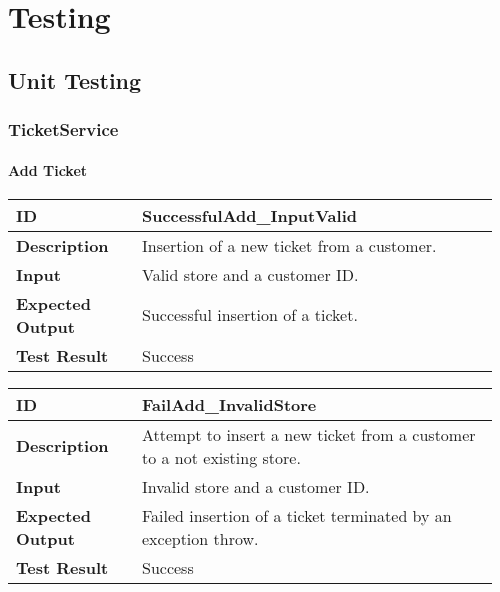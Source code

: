 \chapter{Testing}
\section{Unit Testing}
\subsection{TicketService}
\subsubsection{Add Ticket}
\begin{table}[H]
	\centering
	\begin{tabular}{@{}p{0.25\linewidth}p{0.71\linewidth}@{}}
		\toprule
		\textbf{ID} & SuccessfulAdd\_InputValid \\
		\midrule
		\textbf{Description} & Insertion of a new ticket from a customer. \\
		\midrule
		\textbf{Input} & Valid store and a customer ID.\\
		\midrule
		\textbf{Expected Output} & Successful insertion of a ticket.\\
		\midrule
		\textbf{Test Result} & Success\\
		\bottomrule
	\end{tabular}
\end{table}

\begin{table}[H]
	\centering
	\begin{tabular}{@{}p{0.25\linewidth}p{0.71\linewidth}@{}}
		\toprule
		\textbf{ID} & FailAdd\_InvalidStore \\
		\midrule
		\textbf{Description} & Attempt to insert a new ticket from a customer to a not existing store. \\
		\midrule
		\textbf{Input} & Invalid store and a customer ID.\\
		\midrule
		\textbf{Expected Output} & Failed insertion of a ticket terminated by an exception throw.\\
		\midrule
		\textbf{Test Result} & Success\\
		\bottomrule
	\end{tabular}
\end{table}


